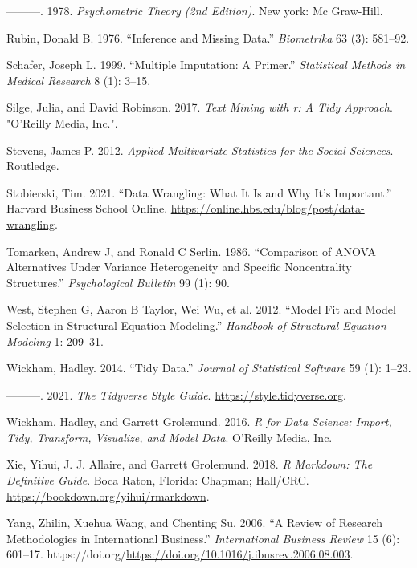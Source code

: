 \documentclass[
  letterpaper,
]{krantz}
\newlength{\cslhangindent}
\newenvironment{CSLReferences}[2] %
 {\begin{list}{}{%
  \setlength{\itemindent}{0pt}
  \setlength{\leftmargin}{0pt}
  \setlength{\parsep}{0pt}
  \ifodd #1
   \setlength{\leftmargin}{\cslhangindent}
   \setlength{\itemindent}{-1\cslhangindent}
  \fi
  \setlength{\itemsep}{#2\baselineskip}}}
 {\end{list}}
\begin{document}
\begin{CSLReferences}{1}{0}
---------. 1978. \emph{Psychometric Theory (2nd Edition)}. New york: Mc
Graw-Hill.

Rubin, Donald B. 1976. {``Inference and Missing Data.''}
\emph{Biometrika} 63 (3): 581--92.

Schafer, Joseph L. 1999. {``Multiple Imputation: A Primer.''}
\emph{Statistical Methods in Medical Research} 8 (1): 3--15.

Silge, Julia, and David Robinson. 2017. \emph{Text Mining with r: A Tidy
Approach}. "O'Reilly Media, Inc.".

Stevens, James P. 2012. \emph{Applied Multivariate Statistics for the
Social Sciences}. Routledge.

Stobierski, Tim. 2021. {``Data Wrangling: What It Is and Why It's
Important.''} Harvard Business School Online.
\url{https://online.hbs.edu/blog/post/data-wrangling}.

Tomarken, Andrew J, and Ronald C Serlin. 1986. {``Comparison of ANOVA
Alternatives Under Variance Heterogeneity and Specific Noncentrality
Structures.''} \emph{Psychological Bulletin} 99 (1): 90.

West, Stephen G, Aaron B Taylor, Wei Wu, et al. 2012. {``Model Fit and
Model Selection in Structural Equation Modeling.''} \emph{Handbook of
Structural Equation Modeling} 1: 209--31.

Wickham, Hadley. 2014. {``Tidy Data.''} \emph{Journal of Statistical
Software} 59 (1): 1--23.

---------. 2021. \emph{The Tidyverse Style Guide}.
\url{https://style.tidyverse.org}.

Wickham, Hadley, and Garrett Grolemund. 2016. \emph{R for Data Science:
Import, Tidy, Transform, Visualize, and Model Data}. {O'Reilly Media,
Inc.}

Xie, Yihui, J. J. Allaire, and Garrett Grolemund. 2018. \emph{R
Markdown: The Definitive Guide}. Boca Raton, Florida: Chapman; Hall/CRC.
\url{https://bookdown.org/yihui/rmarkdown}.

Yang, Zhilin, Xuehua Wang, and Chenting Su. 2006. {``A Review of
Research Methodologies in International Business.''} \emph{International
Business Review} 15 (6): 601--17.
https://doi.org/\url{https://doi.org/10.1016/j.ibusrev.2006.08.003}.

\end{CSLReferences}



\backmatter
\printindex
\end{document}
